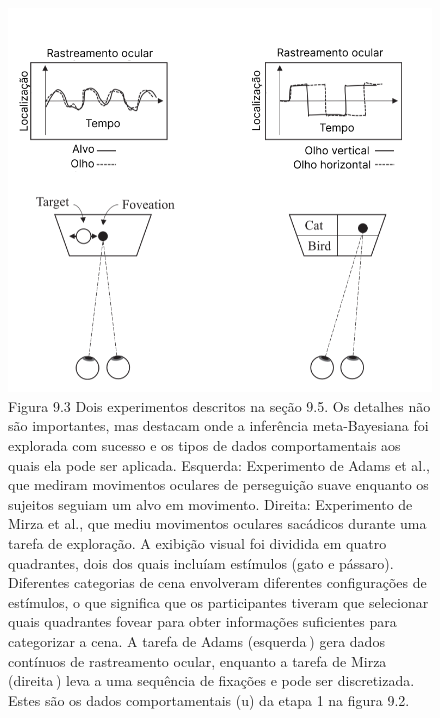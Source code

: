 \documentclass[
  12pt,
]{book}
\begin{document}
\begin{figure}
\centering
\includegraphics{images/Figura_9_3.png}
\caption{Figura 9.3 Dois experimentos descritos na seção 9.5. Os detalhes não são importantes, mas destacam onde a inferência meta-Bayesiana foi explorada com sucesso e os tipos de dados comportamentais aos quais ela pode ser aplicada. Esquerda: Experimento de Adams et al., que mediram movimentos oculares de perseguição suave enquanto os sujeitos seguiam um alvo em movimento. Direita: Experimento de Mirza et al., que mediu movimentos oculares sacádicos durante uma tarefa de exploração. A exibição visual foi dividida em quatro quadrantes, dois dos quais incluíam estímulos (gato e pássaro). Diferentes categorias de cena envolveram diferentes configurações de estímulos, o que significa que os participantes tiveram que selecionar quais quadrantes fovear para obter informações suficientes para categorizar a cena. A tarefa de Adams (esquerda ) gera dados contínuos de rastreamento ocular, enquanto a tarefa de Mirza (direita ) leva a uma sequência de fixações e pode ser discretizada. Estes são os dados comportamentais (u) da etapa 1 na figura 9.2.}
\end{figure}
\end{document}
